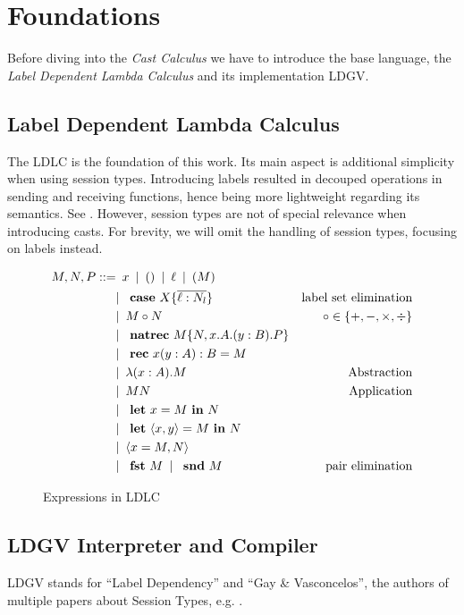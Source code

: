 \newcommand{\letb}{\text{ \textbf{let} }}
\newcommand{\inb}{\text{ \textbf{in} }}
\newcommand{\rec}{\text{ \textbf{rec} }}
\newcommand{\natrec}{\text{ \textbf{natrec} }}
\newcommand{\fstb}{\text{ \textbf{fst} }}
\newcommand{\sndb}{\text{ \textbf{snd} }}

\chapter{Foundations}\label{chap:foundations}

Before diving into the \emph{Cast Calculus} we have to introduce the base language, the \emph{Label Dependent Lambda Calculus} and its implementation LDGV.

\section{Label Dependent Lambda Calculus}

The LDLC is the foundation of this work. Its main aspect is additional simplicity when using session types. Introducing labels resulted in decouped operations in sending and receiving functions, hence being more lightweight regarding its semantics. See \cite{thiemann2019}. However, session types are not of special relevance when introducing casts. For brevity, we will omit the handling of session types, focusing on labels instead.

\begin{figure}
\begin{align*}
 M,N,P ::=
    & \enspace x \enspace|\enspace
      () \enspace|\enspace
      \ell \enspace|\enspace
      (M) \\
    & |\enspace \case X \{\overline{\ell : N_l}\} & \text{label set elimination} \\
    & |\enspace M \circ N & \circ \in \{+,-,\times,\div\} \\
    & |\enspace \natrec M \{ N, x . A . (y : B) . P \} \\
    & |\enspace \rec x ( y : A ) : B = M \\
    & |\enspace \lambda (x : A).M & \text{Abstraction} \\
    & |\enspace M N & \text{Application}\\
    & |\enspace \letb x = M \inb N \\
    & |\enspace \letb \langle x, y \rangle = M \inb N \\
    & |\enspace \langle x = M, N \rangle \\
    & |\enspace \fstb M \enspace|\enspace \sndb M & \text{pair elimination} \\
\end{align*}
\caption{Expressions in LDLC}
\label{fig:ldlc-expressions}
\end{figure}


\section{LDGV Interpreter and Compiler}

LDGV stands for ``Label Dependency'' and ``Gay \& Vasconcelos'', the authors of multiple papers about Session Types, e.g. \cite{gayvasconcelos2010}.
